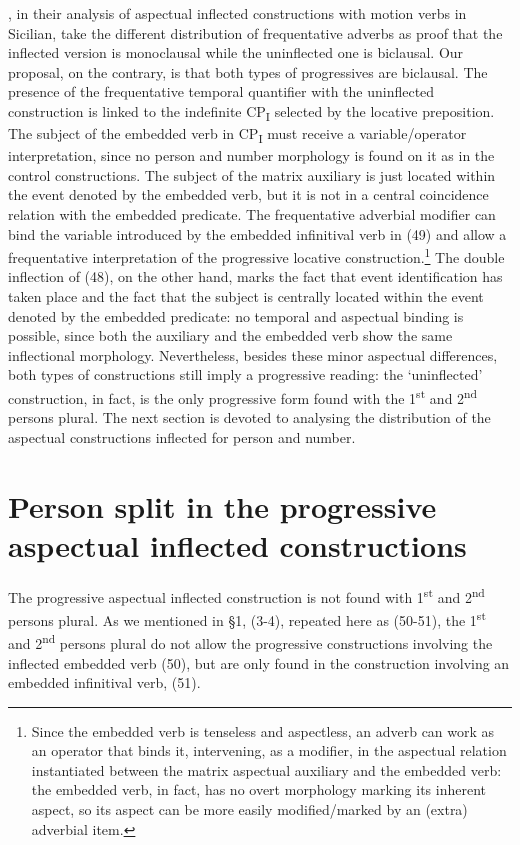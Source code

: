 \documentclass[output=paper]{langsci/langscibook}
\begin{document}
\citet{Cardinalettti2003}, in their analysis of aspectual inflected constructions with motion verbs in Sicilian, take the different distribution of frequentative adverbs as proof that the inflected version is monoclausal while the uninflected one is biclausal. Our proposal, on the contrary, is that both types of progressives are biclausal. The presence of the frequentative temporal quantifier with the uninflected construction is linked to the indefinite CP\textsubscript{I} selected by the locative preposition. The subject of the embedded verb in CP\textsubscript{I} must receive a variable/operator interpretation, since no person and number morphology is found on it as in the control constructions. The subject of the matrix auxiliary is just located within the event denoted by the embedded verb, but it is not in a central coincidence relation with the embedded predicate. The frequentative adverbial modifier can bind the variable introduced by the embedded infinitival verb in (49) and allow a frequentative interpretation of the progressive locative construction.\footnote{Since the embedded verb is tenseless and aspectless, an adverb can work as an operator that binds it, intervening, as a modifier, in the aspectual relation instantiated between the matrix aspectual auxiliary and the embedded verb: the embedded verb, in fact, has no overt morphology marking its inherent aspect, so its aspect can be more easily modified\slash marked by an (extra) adverbial item.} The double inflection of (48), on the other hand, marks the fact that event identification has taken place and the fact that the subject is centrally located within the event denoted by the embedded predicate: no temporal and aspectual binding is possible, since both the auxiliary and the embedded verb show the same inflectional morphology. Nevertheless, besides these minor aspectual differences, both types of constructions still imply a progressive reading: the ‘uninflected’ construction, in fact, is the only progressive form found with the 1\textsuperscript{st} and 2\textsuperscript{nd} persons plural. The next section is devoted to analysing the distribution of the aspectual constructions inflected for person and number.

\section{Person split in the progressive aspectual inflected constructions}%

The progressive aspectual inflected construction is not found with 1\textsuperscript{st} and 2\textsuperscript{nd} persons plural. As we mentioned in §1, (3-4), repeated here as (50-51), the 1\textsuperscript{st} and 2\textsuperscript{nd} persons plural do not allow the progressive constructions involving the inflected embedded verb (50), but are only found in the construction involving an embedded infinitival verb, (51). 
\end{document}
